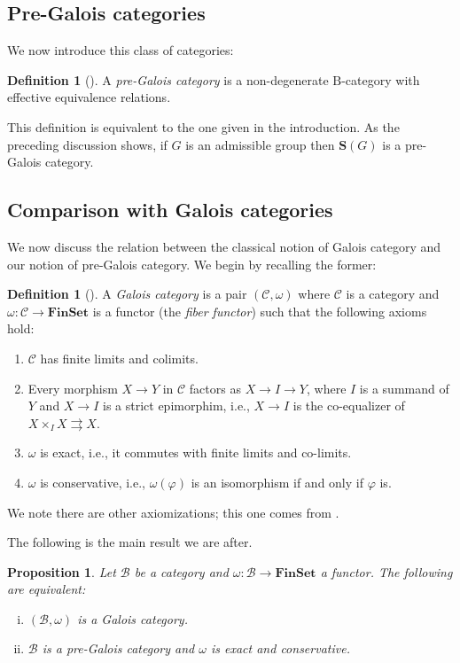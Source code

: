 \documentclass[12pt]{amsart}
\numberwithin{equation}{section}
\newtheorem{proposition}[equation]{Proposition}
\theoremstyle{definition}
\newtheorem{defnaux}[equation]{Definition}
\newenvironment{definition}[1][]{\begin{defnaux}[#1]\pushQED{\qed}}{\popQED \end{defnaux}}
\newcommand{\cB}{\mathcal{B}}
\newcommand{\rB}{\mathrm{B}}
\newcommand{\cC}{\mathcal{C}}
\newcommand{\bS}{\mathbf{S}}
\newcommand{\defn}[1]{\emph{#1}}
\renewcommand{\phi}{\varphi}
\newcommand{\FinSet}{\mathbf{FinSet}}
\begin{document}
\subsection{Pre-Galois categories}

We now introduce this class of categories:

\begin{definition}
A \defn{pre-Galois category} is a non-degenerate $\rB$-category with effective equivalence relations.
\end{definition}

This definition is equivalent to the one given in the introduction. As the preceding discussion shows, if $G$ is an admissible group then $\bS(G)$ is a pre-Galois category.

\subsection{Comparison with Galois categories}

We now discuss the relation between the classical notion of Galois category and our notion of pre-Galois category. We begin by recalling the former:

\begin{definition} \label{def:galois}
A \defn{Galois category} is a pair $(\cC, \omega)$ where $\cC$ is a category and $\omega \colon \cC \to \FinSet$ is a functor (the \defn{fiber functor}) such that the following axioms hold:
\begin{enumerate}
\item $\cC$ has finite limits and colimits.
\item Every morphism $X \to Y$ in $\cC$ factors as $X \to I \to Y$, where $I$ is a summand of $Y$ and $X \to I$ is a strict epimorphim, i.e., $X \to I$ is the co-equalizer of $X \times_I X \rightrightarrows X$.
\item $\omega$ is exact, i.e., it commutes with finite limits and co-limits.
\item $\omega$ is conservative, i.e., $\omega(\phi)$ is an isomorphism if and only if $\phi$ is.
\end{enumerate}
We note there are other axiomizations; this one comes from \cite[\S 2.1.1]{Cadoret}.
\end{definition}

The following is the main result we are after.

\begin{proposition}
Let $\cB$ be a category and $\omega \colon \cB \to \FinSet$ a functor. The following are equivalent:
\begin{enumerate}[(i)]
\item $(\cB, \omega)$ is a Galois category.
\item $\cB$ is a pre-Galois category and $\omega$ is exact and conservative.
\end{enumerate}
\end{proposition}
\end{document}

